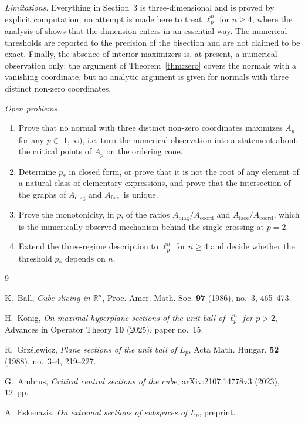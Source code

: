 \documentclass[11pt]{article}
\theoremstyle{plain}
\numberwithin{theorem}{section}
\begin{document}
\emph{Limitations.} Everything in Section~3 is three-dimensional and is proved by explicit computation; no attempt is made here to treat $\ell_p^n$ for $n\ge4$, where the analysis of \cite{konig} shows that the dimension enters in an essential way. The numerical thresholds are reported to the precision of the bisection and are not claimed to be exact. Finally, the absence of interior maximizers is, at present, a numerical observation only: the argument of Theorem~\ref{thm:zero} covers the normals with a vanishing coordinate, but no analytic argument is given for normals with three distinct non-zero coordinates.

\emph{Open problems.}
\begin{enumerate}
\item[(a)] Prove that no normal with three distinct non-zero coordinates maximizes $A_p$ for any $p\in[1,\infty)$, i.e. turn the numerical observation into a statement about the critical points of $A_p$ on the ordering cone.
\item[(b)] Determine $p_*$ in closed form, or prove that it is not the root of any element of a natural class of elementary expressions, and prove that the intersection of the graphs of $A_{\mathrm{diag}}$ and $A_{\mathrm{face}}$ is unique.
\item[(c)] Prove the monotonicity, in $p$, of the ratios $A_{\mathrm{diag}}/A_{\mathrm{coord}}$ and $A_{\mathrm{face}}/A_{\mathrm{coord}}$, which is the numerically observed mechanism behind the single crossing at $p=2$.
\item[(d)] Extend the three-regime description to $\ell_p^n$ for $n\ge4$ and decide whether the threshold $p_*$ depends on $n$.
\end{enumerate}

\begin{thebibliography}{9}

 K.~Ball, \emph{Cube slicing in $\mathbb{R}^n$}, Proc. Amer. Math. Soc. \textbf{97} (1986), no.~3, 465--473.

 H.~K\"onig, \emph{On maximal hyperplane sections of the unit ball of $\ell_p^n$ for $p>2$}, Advances in Operator Theory \textbf{10} (2025), paper no.~15.

 R.~Grz\'slewicz, \emph{Plane sections of the unit ball of $L_p$}, Acta Math. Hungar. \textbf{52} (1988), no.~3--4, 219--227.

 G.~Ambrus, \emph{Critical central sections of the cube}, arXiv:2107.14778v3 (2023), 12~pp.

 A.~Eskenazis, \emph{On extremal sections of subspaces of $L_p$}, preprint.

\end{thebibliography}
\end{document}
